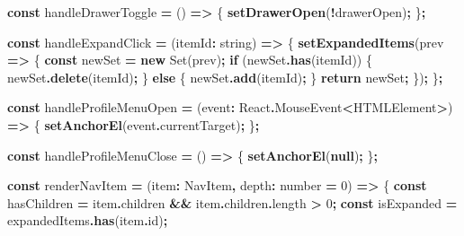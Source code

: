 \documentclass[
]{article}
\newenvironment{Shaded}{\begin{snugshade}}{\end{snugshade}}
\newcommand{\AttributeTok}[1]{\textcolor[rgb]{0.13,0.29,0.53}{#1}}
\newcommand{\BuiltInTok}[1]{#1}
\newcommand{\ControlFlowTok}[1]{\textcolor[rgb]{0.13,0.29,0.53}{\textbf{#1}}}
\newcommand{\DataTypeTok}[1]{\textcolor[rgb]{0.13,0.29,0.53}{#1}}
\newcommand{\DecValTok}[1]{\textcolor[rgb]{0.00,0.00,0.81}{#1}}
\newcommand{\FunctionTok}[1]{\textcolor[rgb]{0.13,0.29,0.53}{\textbf{#1}}}
\newcommand{\KeywordTok}[1]{\textcolor[rgb]{0.13,0.29,0.53}{\textbf{#1}}}
\newcommand{\NormalTok}[1]{#1}
\newcommand{\OperatorTok}[1]{\textcolor[rgb]{0.81,0.36,0.00}{\textbf{#1}}}
\begin{document}
\begin{Shaded}
\begin{Highlighting}[]
  \KeywordTok{const}\NormalTok{ handleDrawerToggle }\OperatorTok{=}\NormalTok{ () }\KeywordTok{=\textgreater{}}\NormalTok{ \{}
    \FunctionTok{setDrawerOpen}\NormalTok{(}\OperatorTok{!}\NormalTok{drawerOpen)}\OperatorTok{;}
\NormalTok{  \}}\OperatorTok{;}

  \KeywordTok{const}\NormalTok{ handleExpandClick }\OperatorTok{=}\NormalTok{ (itemId}\OperatorTok{:} \DataTypeTok{string}\NormalTok{) }\KeywordTok{=\textgreater{}}\NormalTok{ \{}
    \FunctionTok{setExpandedItems}\NormalTok{(prev }\KeywordTok{=\textgreater{}}\NormalTok{ \{}
      \KeywordTok{const}\NormalTok{ newSet }\OperatorTok{=} \KeywordTok{new} \BuiltInTok{Set}\NormalTok{(prev)}\OperatorTok{;}
      \ControlFlowTok{if}\NormalTok{ (newSet}\OperatorTok{.}\FunctionTok{has}\NormalTok{(itemId)) \{}
\NormalTok{        newSet}\OperatorTok{.}\FunctionTok{delete}\NormalTok{(itemId)}\OperatorTok{;}
\NormalTok{      \} }\ControlFlowTok{else}\NormalTok{ \{}
\NormalTok{        newSet}\OperatorTok{.}\FunctionTok{add}\NormalTok{(itemId)}\OperatorTok{;}
\NormalTok{      \}}
      \ControlFlowTok{return}\NormalTok{ newSet}\OperatorTok{;}
\NormalTok{    \})}\OperatorTok{;}
\NormalTok{  \}}\OperatorTok{;}

  \KeywordTok{const}\NormalTok{ handleProfileMenuOpen }\OperatorTok{=}\NormalTok{ (event}\OperatorTok{:}\NormalTok{ React}\OperatorTok{.}\AttributeTok{MouseEvent}\OperatorTok{\textless{}}\BuiltInTok{HTMLElement}\OperatorTok{\textgreater{}}\NormalTok{) }\KeywordTok{=\textgreater{}}\NormalTok{ \{}
    \FunctionTok{setAnchorEl}\NormalTok{(}\BuiltInTok{event}\OperatorTok{.}\AttributeTok{currentTarget}\NormalTok{)}\OperatorTok{;}
\NormalTok{  \}}\OperatorTok{;}

  \KeywordTok{const}\NormalTok{ handleProfileMenuClose }\OperatorTok{=}\NormalTok{ () }\KeywordTok{=\textgreater{}}\NormalTok{ \{}
    \FunctionTok{setAnchorEl}\NormalTok{(}\KeywordTok{null}\NormalTok{)}\OperatorTok{;}
\NormalTok{  \}}\OperatorTok{;}

  \KeywordTok{const}\NormalTok{ renderNavItem }\OperatorTok{=}\NormalTok{ (item}\OperatorTok{:}\NormalTok{ NavItem}\OperatorTok{,}\NormalTok{ depth}\OperatorTok{:} \DataTypeTok{number} \OperatorTok{=} \DecValTok{0}\NormalTok{) }\KeywordTok{=\textgreater{}}\NormalTok{ \{}
    \KeywordTok{const}\NormalTok{ hasChildren }\OperatorTok{=}\NormalTok{ item}\OperatorTok{.}\AttributeTok{children} \OperatorTok{\&\&}\NormalTok{ item}\OperatorTok{.}\AttributeTok{children}\OperatorTok{.}\AttributeTok{length} \OperatorTok{\textgreater{}} \DecValTok{0}\OperatorTok{;}
    \KeywordTok{const}\NormalTok{ isExpanded }\OperatorTok{=}\NormalTok{ expandedItems}\OperatorTok{.}\FunctionTok{has}\NormalTok{(item}\OperatorTok{.}\AttributeTok{id}\NormalTok{)}\OperatorTok{;}


\end{Highlighting}
\end{Shaded}
\end{document}
